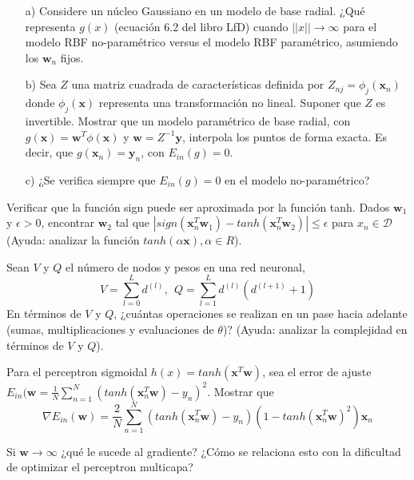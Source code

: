 \documentclass[12pt]{article}
\theoremstyle{definition}
\begin{document}
\begin{pregunta}
\begin{enumerate}
\item[a)] Considere un núcleo Gaussiano en un modelo de base radial. ¿Qué representa $g(x)$ (ecuación 6.2 del libro LfD) cuando $||x|| \rightarrow \infty$ para el modelo RBF no-paramétrico versus el modelo RBF paramétrico, asumiendo los $\mathbf{w}_n$ fijos.
\item[b)] Sea $Z$ una matriz cuadrada de características definida por $Z_{nj} = \phi_j(\mathbf{x}_n)$ donde $\phi_j(\mathbf{x})$ representa una transformación no lineal. Suponer que $Z$ es invertible. Mostrar que un modelo paramétrico de base radial, con $g(\mathbf{x}) = \mathbf{w}^T \phi(\mathbf{x})$ y $\mathbf{w} = Z^{-1}\mathbf{y}$, interpola los puntos de forma exacta. Es decir, que $g(\mathbf{x}_n) = \mathbf{y}_n$, con $E_{in}(g)=0$.
\item[c)] ¿Se verifica siempre que $E_{in}(g)=0$ en el modelo no-paramétrico?
\end{enumerate}


\end{pregunta}

\begin{pregunta}
Verificar que la función sign puede ser aproximada por la función tanh. Dados $\mathbf{w}_1$ y $\epsilon > 0$, encontrar $\mathbf{w}_2$ tal que $|sign(\mathbf{x}_n^T \mathbf{w}_1) - tanh(\mathbf{x}_n^T \mathbf{w}_2)| \leq \epsilon$ para $x_n \in \mathcal{D}$ (Ayuda: analizar la función $tanh(\alpha \mathbf{x}), \alpha \in R$).\\


\end{pregunta}

\begin{pregunta}
Sean $V$ y $Q$ el número de nodos y pesos en una red neuronal,
\[ V = \sum_{l=0}^L d^{(l)},\ \ Q = \sum_{l=1}^L d^{(l)} (d^{(l+1)}+1)	\]
En términos de $V$ y $Q$, ¿cuántas operaciones se realizan en un pase hacia adelante (sumas, multiplicaciones y evaluaciones de $\theta$)? (Ayuda: analizar la complejidad en términos de $V$ y $Q$).\\


\end{pregunta}

\begin{pregunta}
Para el perceptron sigmoidal $h(x) = tanh(\mathbf{x}^T\mathbf{w})$, sea el error de ajuste $E_{in}(\mathbf{w} = \frac{1}{N} \sum_{n=1}^N (tanh(\mathbf{x}_n^T\mathbf{w}) - y_n)^2$. Mostrar que
\[ \nabla E_{in}(\mathbf{w}) = \frac{2}{N} \sum_{n=1}^N (tanh(\mathbf{x}_n^T \mathbf{w}) -y_n) (1-tanh(\mathbf{x}_n^T \mathbf{w})^2)\mathbf{x}_n	\]

Si $\mathbf{w} \rightarrow \infty$ ¿qué le sucede al gradiente? ¿Cómo se relaciona esto con la dificultad de optimizar el perceptron multicapa?\\


\end{pregunta}
\end{document}
